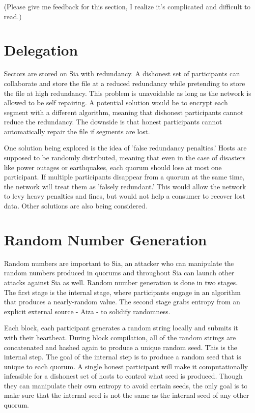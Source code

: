 \documentclass[twocolumn]{article}
\begin{document}
(Please give me feedback for this section, I realize it's complicated and difficult to read.)

\section{Delegation}
Sectors are stored on Sia with redundancy.
A dishonest set of participants can collaborate and store the file at a reduced redundancy while pretending to store the file at high redundancy.
This problem is unavoidable as long as the network is allowed to be self repairing.
A potential solution would be to encrypt each segment with a different algorithm, meaning that dishonest participants cannot reduce the redundancy.
The downside is that honest participants cannot automatically repair the file if segments are lost.

One solution being explored is the idea of 'false redundancy penalties.'
Hosts are supposed to be randomly distributed, meaning that even in the case of disasters like power outages or earthquakes, each quorum should lose at most one participant.
If multiple participants disappear from a quorum at the same time, the network will treat them as 'falsely redundant.'
This would allow the network to levy heavy penalties and fines, but would not help a consumer to recover lost data.
Other solutions are also being considered.

\section{Random Number Generation}
Random numbers are important to Sia, an attacker who can manipulate the random numbers produced in quorums and throughout Sia can launch other attacks against Sia as well.
Random number generation is done in two stages.
The first stage is the internal stage, where participants engage in an algorithm that produces a nearly-random value.
The second stage grabs entropy from an explicit external source - Aiza - to solidify randomness.

Each block, each participant generates a random string locally and submits it with their heartbeat.
During block compilation, all of the random strings are concatenated and hashed again to produce a unique random seed.
This is the internal step.
The goal of the internal step is to produce a random seed that is unique to each quorum.
A single honest participant will make it computationally infeasible for a dishonest set of hosts to control what seed is produced.
Though they can manipulate their own entropy to avoid certain seeds, the only goal is to make sure that the internal seed is not the same as the internal seed of any other quorum.
\end{document}
